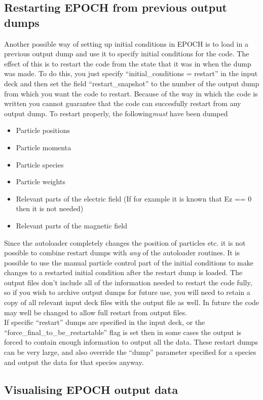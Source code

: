 \documentclass[12pt]{article}
\newcommand{\EPOCH}{{\color{warwickdark}\fontfamily{phv}\selectfont EPOCH} }
\begin{document}
\subsection{Restarting \EPOCH from previous output dumps}
Another possible way of setting up initial conditions in \EPOCH is to load in
a previous output dump and use it to specify initial conditions for the
code. The effect of this is to restart the code from the state that it was in
when the dump was made. To do this, you just specify ``initial\_conditions =
restart'' in the input deck and then set the field ``restart\_snapshot'' to
the number of the output dump from which you want the code to restart. Because
of the way in which the code is written you cannot guarantee that the code can
succesfully restart from any output dump. To restart properly, the
following{\it must} have been dumped
\begin{itemize}
\item Particle positions
\item Particle momenta
\item Particle species
\item Particle weights
\item Relevant parts of the electric field (If for example it is known that Ez
  == 0 then it is not needed)
\item Relevant parts of the magnetic field
\end{itemize}
Since the autoloader completely changes the position of particles etc. it is
not possible to combine restart dumps with {\it any} of the autoloader
routines. It is possible to use the manual particle control part of the
initial conditions to make changes to a restarted initial condition after the
restart dump is loaded. The output files don't include all of the information
needed to restart the code fully, so if you wish to archive output dumps for
future use, you will need to retain a copy of all relevant input deck files
with the output file as well. In future the code may well be changed to allow
full restart from output files.\\

If specific ``restart'' dumps are specified in the input deck, or the
``force\_final\_to\_be\_restartable'' flag is set then in some cases the
output is forced to contain enough information to output all the data. These
restart dumps can be very large, and also override the ``dump'' parameter
specified for a species and output the data for that species anyway.

\subsection{Visualising \EPOCH output data}
\end{document}
